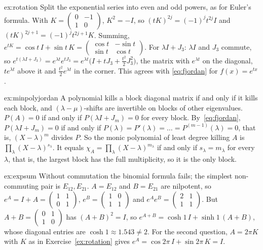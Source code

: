 \begin{solution}{ex:rotation}
\idea Split the exponential series into even and odd powers, as for Euler's formula.
\writeup With $K=\begin{pmatrix}0&-1\\1&0\end{pmatrix}$, $K^2=-I$, so $(tK)^{2j}=(-1)^jt^{2j}I$ and $(tK)^{2j+1}=(-1)^jt^{2j+1}K$.
Summing, $e^{tK}=\cos t\,I+\sin t\,K=\begin{pmatrix}\cos t&-\sin t\\\sin t&\cos t\end{pmatrix}$. For $\lambda I+J_3$: $\lambda I$ and
$J_3$ commute, so $e^{t(\lambda I+J_3)}=e^{\lambda t}e^{tJ_3}=e^{\lambda t}\bigl(I+tJ_3+\tfrac{t^2}2J_3^2\bigr)$, the matrix with
$e^{\lambda t}$ on the diagonal, $te^{\lambda t}$ above it and $\frac{t^2}2e^{\lambda t}$ in the corner. This agrees with
\eqref{eq:fjordan} for $f(x)=e^{tx}$.
\end{solution}

\begin{solution}{ex:minpolyjordan}
\idea A polynomial kills a block diagonal matrix if and only if it kills each block, and $(\lambda-\mu)$-shifts are
invertible on blocks of other eigenvalues.
\writeup $P(A)=0$ if and only if $P(\lambda I+J_m)=0$ for every block. By~\eqref{eq:fjordan}, $P(\lambda I+J_m)=0$ if and only if
$P(\lambda)=P'(\lambda)=\dots=P^{(m-1)}(\lambda)=0$, that is, $(X-\lambda)^m$ divides $P$. So the monic polynomial of least degree
killing $A$ is $\prod_\lambda(X-\lambda)^{s_\lambda}$. It equals $\chi_A=\prod_\lambda(X-\lambda)^{m_\lambda}$ if and only if $s_\lambda=m_\lambda$ for every
$\lambda$, that is, the largest block has the full multiplicity, so it is the only block.
\end{solution}

\begin{solution}{ex:expsum}
\idea Without commutation the binomial formula fails; the simplest non-commuting pair is $E_{12},E_{21}$.
\writeup $A=E_{12}$ and $B=E_{21}$ are nilpotent, so $e^A=I+A=\begin{pmatrix}1&1\\0&1\end{pmatrix}$, $e^B=\begin{pmatrix}1&0\\1&1\end{pmatrix}$ and
$e^Ae^B=\begin{pmatrix}2&1\\1&1\end{pmatrix}$. But $A+B=\begin{pmatrix}0&1\\1&0\end{pmatrix}$ has $(A+B)^2=I$, so
$e^{A+B}=\cosh1\,I+\sinh1\,(A+B)$, whose diagonal entries are $\cosh1\approx1.543\ne2$. For the second question,
$A=2\pi K$ with $K$ as in Exercise~\ref{ex:rotation} gives $e^A=\cos2\pi\,I+\sin2\pi\,K=I$.
\end{solution}


